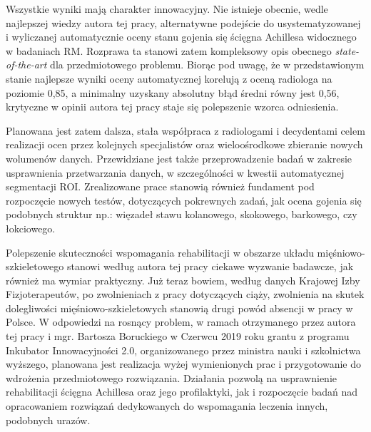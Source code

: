 Wszystkie wyniki mają charakter innowacyjny. Nie istnieje obecnie, wedle najlepszej wiedzy autora tej pracy, alternatywne podejście do usystematyzowanej i wyliczanej automatycznie oceny stanu gojenia się ścięgna Achillesa widocznego w badaniach RM. Rozprawa ta stanowi zatem kompleksowy opis obecnego \textit{state-of-the-art} dla przedmiotowego problemu. Biorąc pod uwagę, że w przedstawionym stanie najlepsze wyniki oceny automatycznej korelują z oceną radiologa na poziomie 0,85, a minimalny uzyskany absolutny błąd średni równy jest 0,56, krytyczne w opinii autora tej pracy staje się polepszenie wzorca odniesienia. 

Planowana jest zatem dalsza, stała współpraca z radiologami i decydentami celem realizacji ocen przez kolejnych specjalistów oraz wieloośrodkowe zbieranie nowych wolumenów danych. Przewidziane jest także przeprowadzenie badań w zakresie usprawnienia przetwarzania danych, w szczególności w kwestii automatycznej segmentacji ROI. Zrealizowane prace stanowią również fundament pod rozpoczęcie nowych testów, dotyczących pokrewnych zadań, jak ocena gojenia się podobnych struktur np.: więzadeł stawu kolanowego, skokowego, barkowego, czy łokciowego. 

Polepszenie skuteczności wspomagania rehabilitacji w obszarze układu mięśniowo-szkieletowego stanowi według autora tej pracy ciekawe wyzwanie badawcze, jak również ma wymiar praktyczny. Już teraz bowiem, według danych Krajowej Izby Fizjoterapeutów, po zwolnieniach z pracy dotyczących ciąży, zwolnienia na skutek dolegliwości mięśniowo-szkieletowych stanowią drugi powód absencji w pracy w Polsce. \linebreak W odpowiedzi na rosnący problem, w ramach otrzymanego przez autora tej pracy i mgr. Bartosza Boruckiego w Czerwcu 2019 roku grantu z programu Inkubator Innowacyjności 2.0, organizowanego przez ministra nauki i szkolnictwa wyższego, planowana jest realizacja wyżej wymienionych prac i przygotowanie do wdrożenia przedmiotowego rozwiązania. Działania pozwolą na usprawnienie rehabilitacji ścięgna Achillesa oraz jego profilaktyki, jak i rozpoczęcie badań nad opracowaniem rozwiązań dedykowanych do wspomagania leczenia innych, podobnych urazów.






